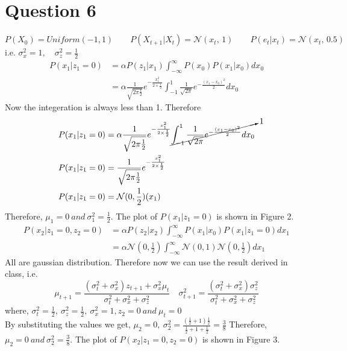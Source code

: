 \documentclass[letter, 9pt]{article}
\begin{document}
\section*{Question 6}
$P(X_0)=Uniform(-1,1) \qquad P(X_{t+1}|X_{t})=\mathcal{N}(x_t,\,1) \qquad P(e_t|x_t)=\mathcal{N}(x_t,\,0.5)$\\
i.e. $\sigma_x^2=1,\quad \sigma_z^2=\frac{1}{2}$\\
\begin{align*}
    P(x_1|z_1=0) & =\alpha P(z_1|x_1)\int_{-\infty}^{\infty}P(x_0)P(x_1|x_0) dx_0\\
    & = \alpha \frac{1}{\sqrt{2\pi\frac{1}{2}}}e^{-\frac{x_1^2}{2\times\frac{1}{2}}}\int_{-1}^{1}\frac{1}{\sqrt{2\pi}}e^{-\frac{(x_1-x_0)^2}{2}} dx_0
\end{align*}
Now the integeration is always less than 1. Therefore
\begin{align*}
P(x_1|z_1=0) & = \alpha \frac{1}{\sqrt{2\pi\frac{1}{2}}}e^{-\frac{x_1^2}{2\times\frac{1}{2}}}\cancelto{1}{\int_{-1}^{1}\frac{1}{\sqrt{2\pi}}e^{-\frac{(x_1-x_0)^2}{2}} dx_0}\\
P(x_1|z_1=0) & = \frac{1}{\sqrt{2\pi\frac{1}{2}}}e^{-\frac{x_1^2}{2\times\frac{1}{2}}}\\
P(x_1|z_1=0) & = \mathcal{N}(0,\frac{1}{2})(x_1)
\end{align*}
Therefore, $\mu_1=0\ and\ \sigma_1^2 = \frac{1}{2}$. The plot of $P(x_1|z_1=0)$ is shown in Figure 2.
\begin{align*}
    P(x_2|z_1=0, z_2=0) & =\alpha P(z_2|x_2)\int_{-\infty}^{\infty}P(x_1|x_0)P(x_1|z_1=0)dx_1\\
    & = \alpha \mathcal{N}(0,\frac{1}{2})\int_{-\infty}^{\infty}\mathcal{N}(0,1)\mathcal{N}(0,\frac{1}{2})dx_1
\end{align*}
All are gaussian distribution. Therefore now we can use the result derived in class, i.e.
\begin{equation*}
    \mu_{t+1} = \frac{(\sigma_t^2+\sigma_x^2)z_{t+1}+\sigma_x^2\mu_t}{\sigma_t^2+\sigma_x^2+\sigma_z^2} \quad \sigma_{t+1}^2=\frac{(\sigma_t^2+\sigma_x^2)\sigma_z^2}{\sigma_t^2+\sigma_x^2+\sigma_z^2}
\end{equation*}
where, $\sigma_t^2=\frac{1}{2},\ \sigma_z^2=\frac{1}{2},\ \sigma_x^2=1, z_2=0\ and\ \mu_t=0$\\
By substituting the values we get, $\mu_2=0,\ \sigma_2^2 = \frac{(\frac{1}{2}+1)\frac{1}{2}}{\frac{1}{2}+1+\frac{1}{2}} = \frac{3}{8}$
Therefore, $\mu_2=0\ and\ \sigma_2^2 = \frac{3}{8}$. The plot of $P(x_2|z_1=0, z_2=0)$ is shown in Figure 3.
\end{document}

